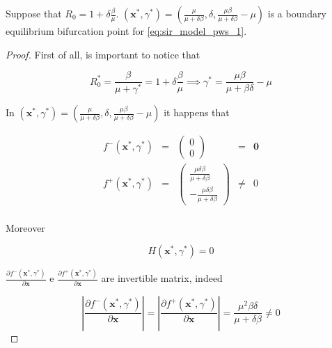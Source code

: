\begin{theorem} Suppose that $R_0 = 1+\delta\frac{\beta}{\mu}$. $(\textbf{x}^*,\gamma^*) = \left(\frac{\mu}{\mu+\delta\beta},\delta,\frac{\mu\beta}{\mu+\delta\beta}-\mu\right)$ is a boundary equilibrium bifurcation point for \ref{eq:sir_model_pws_1}.
\end{theorem}

\begin{proof}
First of all, is important to notice that
 
\begin{equation}
    R_0^* = \frac{\beta}{\mu+\gamma^*} = 1+\delta\frac{\beta}{\mu} \implies \gamma^* = \frac{\mu\beta}{\mu+\beta\delta} - \mu
\end{equation}

In $(\textbf{x}^*,\gamma^*) = \left(\frac{\mu}{\mu+\delta\beta},\delta,\frac{\mu\beta}{\mu+\delta\beta}-\mu\right)$ it happens that 

\begin{equation}
\label{eq:bifurcation_point_cond_1}
    \begin{array}{ccccc}
        f^-(\textbf{x}^*,\gamma^*) &=& \begin{pmatrix} 0 \\ 0 \end{pmatrix} & = & \textbf{0} \\
        f^+(\textbf{x}^*,\gamma^*) &=& \begin{pmatrix} \frac{\mu\delta\beta}{\mu+\delta\beta} \\ -\frac{\mu\delta\beta}{\mu+\delta\beta} \end{pmatrix} & \neq & 0 \\
    \end{array}
\end{equation}

Moreover

\begin{equation}
\label{eq:bifurcation_point_cond_2}
    H(\textbf{x}^*,\gamma^*) = 0
\end{equation}

$\frac{\partial f^-(\textbf{x}^*,\gamma^*)}{\partial \textbf{x}}$ e $\frac{\partial f^+(\textbf{x}^*,\gamma^*)}{\partial \textbf{x}}$ are invertible matrix, indeed

\begin{equation}
\label{eq:bifurcation_point_cond_3}
    \left| \frac{\partial f^-(\textbf{x}^*,\gamma^*)}{\partial \textbf{x}} \right| = \left| \frac{\partial f^+(\textbf{x}^*,\gamma^*)}{\partial \textbf{x}} \right| =  \frac{\mu^2\beta\delta}{\mu+\delta\beta} \neq 0
\end{equation}


\end{proof}
